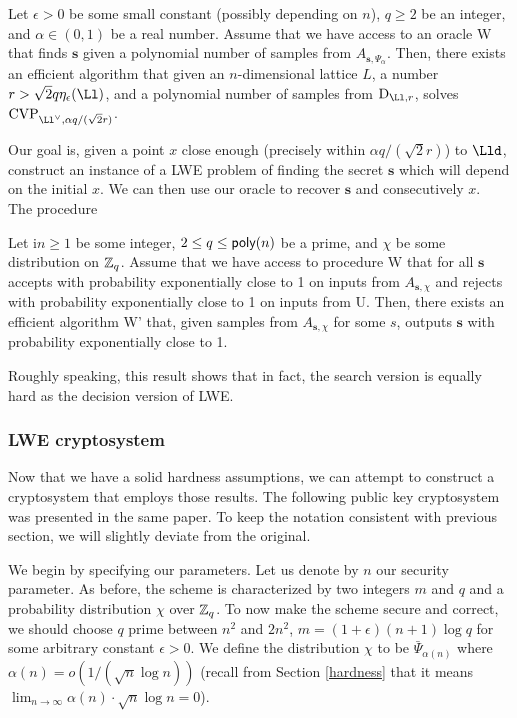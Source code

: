 \begin{lemma}\label{classical}
	Let $\epsilon > 0$ be some small constant (possibly depending on $n$), $q \geq 2$ be an integer, and $\alpha \in (0, 1)$ be a real number. Assume that we have access to an oracle W that finds $\bm{s}$ given a polynomial number of samples from $A_{\bm{s},\Psi_{\alpha}}$. Then, there exists an efficient algorithm that given an $n$-dimensional lattice $L$, a number $r > \sqrt{2}q \eta_{\epsilon}(\Ll)$, and a polynomial number of samples from $\text{D}_{\Ll,r}$, solves $\text{CVP}_{\Ll^{\vee},\alpha q/(\sqrt{2}r)}$.
\end{lemma}
Our goal is, given a point $x$ close enough (precisely within $\alpha q/(\sqrt{2}r)$) to $\Lld$, construct an instance of a LWE problem of finding the secret $\bm{s}$ which will depend on the initial $x$. We can then use our oracle to recover $\bm{s}$ and consecutively $x$. \\
The procedure

\begin{lemma}\label{quantum}
\end{lemma}
\begin{lemma}\label{s-to-d}
	Let i$n \geq 1$ be some integer, $2 \leq q \leq \alg{poly}(n)$ be a prime, and $\chi$ be some distribution on $\mathbb{Z}_q$. Assume that we have access to procedure W that for all $\bm{s}$ accepts with probability exponentially close to 1 on inputs from $A_{\bm{s},\chi}$ and rejects with probability exponentially close to 1 on inputs from U. Then, there exists an efficient algorithm W' that, given samples from $A_{\bm{s},\chi}$ for some $s$, outputs $\bm{s}$ with probability exponentially close to 1.
\end{lemma}

Roughly speaking, this result shows that in fact, the search version is equally hard as the decision version of LWE.  

\subsubsection{LWE cryptosystem}
Now that we have a solid hardness assumptions, we can attempt to construct a cryptosystem that employs those results. The following public key cryptosystem was presented in the same paper. To keep the notation consistent with previous section, we will slightly deviate from the original.

We begin by specifying our parameters. Let us denote by $n$ our security parameter. As before, the scheme is characterized by two integers $m$ and $q$ and a probability distribution $\chi$ over $\mathbb{Z}_q$. To now make the scheme secure and correct, we should choose $q$ prime between $n^2$ and $2n^2$, $m = (1 + \epsilon)(n + 1) \log q$ for some arbitrary constant $\epsilon > 0$. We define the distribution $\chi$ to be $\bar{\Psi}_{\alpha (n)}$ where $\alpha (n) = o(1/(\sqrt{n} \log n))$ (recall from Section \ref{hardness} that it means $\lim_{n\to\infty} \alpha (n) \cdot \sqrt{n} \log n = 0$).\\

